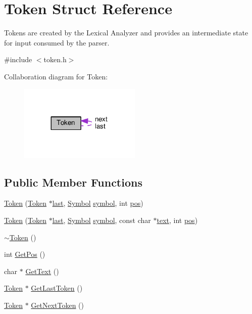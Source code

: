 \hypertarget{structToken}{}\section{Token Struct Reference}
\label{structToken}


Tokens are created by the Lexical Analyzer and provides an intermediate state for input consumed by the parser.  




{\ttfamily \#include $<$token.\+h$>$}



Collaboration diagram for Token\+:
\nopagebreak
\begin{figure}[H]
\begin{center}
\leavevmode
\includegraphics[width=164pt]{d3/da0/structToken__coll__graph}
\end{center}
\end{figure}
\subsection*{Public Member Functions}
\begin{DoxyCompactItemize}
\item 
\hyperlink{structToken_a6331b847b4dc8cebe0e0a79c4de63204}{Token} (\hyperlink{structToken}{Token} $\ast$\hyperlink{structToken_a0ea44230386ca31fabb9a4946249d53f}{last}, \hyperlink{lex_8h_a7feef761cd73fac6e25b8bb80d2c4e54}{Symbol} \hyperlink{structToken_aa671eaaae5632c5277e89a090d864820}{symbol}, int \hyperlink{structToken_afc3014d7e8cbd70e58a55bea24fc2544}{pos})
\item 
\hyperlink{structToken_a5c78001ebd223017c11e5327667d458a}{Token} (\hyperlink{structToken}{Token} $\ast$\hyperlink{structToken_a0ea44230386ca31fabb9a4946249d53f}{last}, \hyperlink{lex_8h_a7feef761cd73fac6e25b8bb80d2c4e54}{Symbol} \hyperlink{structToken_aa671eaaae5632c5277e89a090d864820}{symbol}, const char $\ast$\hyperlink{structToken_ab2d6b41ba04b1a1e272d7e963303f8db}{text}, int \hyperlink{structToken_afc3014d7e8cbd70e58a55bea24fc2544}{pos})
\item 
\hyperlink{structToken_a3d7d59eaac1535df1433357d5d372f84}{$\sim$\+Token} ()
\item 
int \hyperlink{structToken_a5f93ea94940a6eeb060507e1da594599}{Get\+Pos} ()
\item 
char $\ast$ \hyperlink{structToken_a15f1043de07ce8e452fbf115b85def71}{Get\+Text} ()
\item 
\hyperlink{structToken}{Token} $\ast$ \hyperlink{structToken_af5213b25192a01f526143461ab47e6af}{Get\+Last\+Token} ()
\item 
\hyperlink{structToken}{Token} $\ast$ \hyperlink{structToken_ac7eb963d5eff544dd48ffc23aa274356}{Get\+Next\+Token} ()
\end{DoxyCompactItemize}
